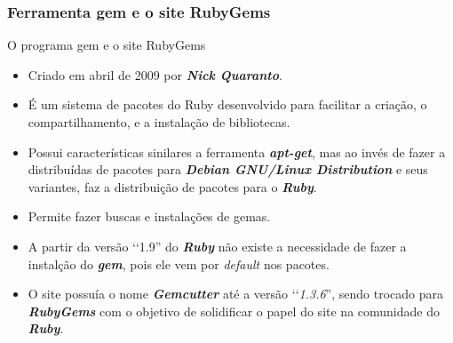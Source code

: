 \begin{frame}
 \frametitle{Ferramenta gem e o site RubyGems}

  \begin{block}{O programa gem e o site RubyGems}
  
   \begin{itemize}
   
    \item Criado em abril de 2009 por \emph{\textbf{Nick Quaranto}}.        
   
    \item É um sistema de pacotes do Ruby desenvolvido para facilitar a criação, o 
    compartilhamento, e a instalação de bibliotecas.
    
    \item Possui características sinilares a ferramenta \emph{\textbf{apt-get}}, mas ao invés de fazer a 
    distribuídas de pacotes para \emph{\textbf{Debian GNU/Linux Distribution}} e seus variantes, faz a distribuição 
    de pacotes para o \emph{\textbf{Ruby}}.        
    
    \item Permite fazer buscas e instalações de gemas.
    
    \item A partir da versão ‘‘1.9'' do \emph{\textbf{Ruby}} não existe a necessidade de fazer a instalção do 
    \emph{\textbf{gem}}, pois ele vem por \emph{default} nos pacotes.
    
    \item O site possuía o nome \emph{\textbf{Gemcutter}} até a versão ‘‘\emph{1.3.6}'', sendo trocado para 
    \emph{\textbf{RubyGems}} com o objetivo de solidificar o papel do site na comunidade do \emph{\textbf{Ruby}}.
    
   \end{itemize}
    
  \end{block}  
  
\end{frame}


